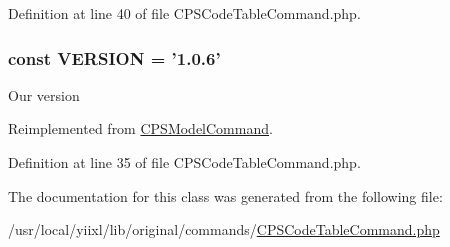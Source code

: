 Definition at line 40 of file CPSCodeTableCommand.php.

\hypertarget{classCPSCodeTableCommand_af71005841ce53adac00581ab0ba24c1f}{
\subsubsection[{VERSION}]{\setlength{\rightskip}{0pt plus 5cm}const {\bf VERSION} = '1.0.6'}}
\label{classCPSCodeTableCommand_af71005841ce53adac00581ab0ba24c1f}
Our version 

Reimplemented from \hyperlink{classCPSModelCommand_af71005841ce53adac00581ab0ba24c1f}{CPSModelCommand}.



Definition at line 35 of file CPSCodeTableCommand.php.



The documentation for this class was generated from the following file:\begin{DoxyCompactItemize}
\item 
/usr/local/yiixl/lib/original/commands/\hyperlink{CPSCodeTableCommand_8php}{CPSCodeTableCommand.php}\end{DoxyCompactItemize}
